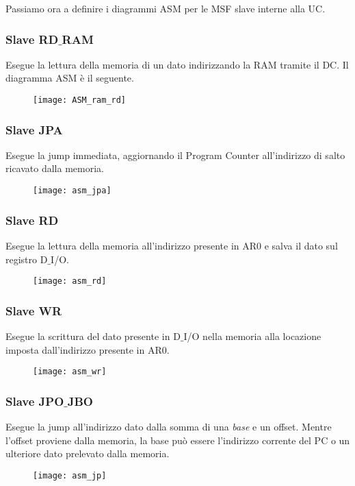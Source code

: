 Passiamo ora a definire i diagrammi ASM per le MSF slave interne alla UC.
\subsubsection{Slave RD$\_$RAM}
Esegue la lettura della memoria di un dato indirizzando la RAM tramite il DC. Il diagramma ASM è il seguente.
\begin{figure}[H]
	\centering
	\texttt{[image: ASM\_ram\_rd]}
	\label{fig:asm_ram_rd}
\end{figure}

\newpage
\subsubsection{Slave JPA}
Esegue la jump immediata, aggiornando il Program Counter all'indirizzo di salto ricavato dalla memoria.
\begin{figure}[H]
	\centering
	\texttt{[image: asm\_jpa]}
	\label{fig:asm_jpa}
\end{figure}

\newpage
\subsubsection{Slave RD}
Esegue la lettura della memoria all'indirizzo presente in AR0 e salva il dato sul registro D$\_$I/O.
\begin{figure}[H]
	\centering
	\texttt{[image: asm\_rd]}
	\label{fig:asm_rd}
\end{figure}

\newpage
\subsubsection{Slave WR}
Esegue la scrittura del dato presente in D$\_$I/O nella memoria alla locazione imposta dall'indirizzo presente in AR0.
\begin{figure}[H]
\centering
\texttt{[image: asm\_wr]}
\label{fig:asm_wr}
\end{figure}

\newpage
\subsubsection{Slave JPO$\_$JBO}
Esegue la jump all'indirizzo dato dalla somma di una \textit{base} e un offset. Mentre l'offset proviene dalla memoria, la base può essere l'indirizzo corrente del PC o un ulteriore dato prelevato dalla memoria.
\begin{figure}[H]
	\centering
	\texttt{[image: asm\_jp]}
	\label{fig:asm_jp}
\end{figure}

